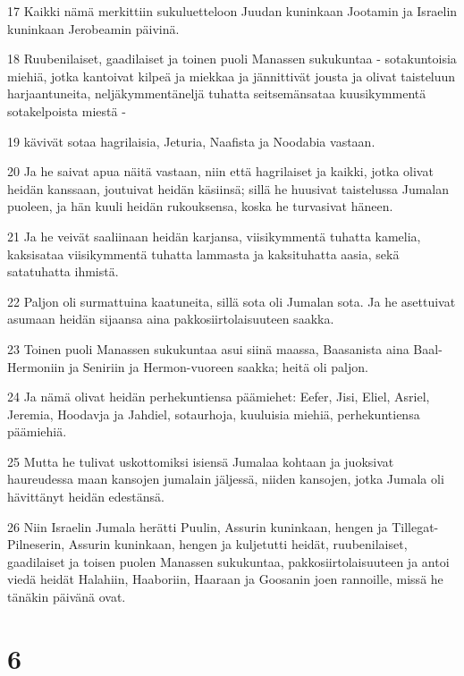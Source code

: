 \par 17 Kaikki nämä merkittiin sukuluetteloon Juudan kuninkaan Jootamin ja Israelin kuninkaan Jerobeamin päivinä.
\par 18 Ruubenilaiset, gaadilaiset ja toinen puoli Manassen sukukuntaa - sotakuntoisia miehiä, jotka kantoivat kilpeä ja miekkaa ja jännittivät jousta ja olivat taisteluun harjaantuneita, neljäkymmentäneljä tuhatta seitsemänsataa kuusikymmentä sotakelpoista miestä -
\par 19 kävivät sotaa hagrilaisia, Jeturia, Naafista ja Noodabia vastaan.
\par 20 Ja he saivat apua näitä vastaan, niin että hagrilaiset ja kaikki, jotka olivat heidän kanssaan, joutuivat heidän käsiinsä; sillä he huusivat taistelussa Jumalan puoleen, ja hän kuuli heidän rukouksensa, koska he turvasivat häneen.
\par 21 Ja he veivät saaliinaan heidän karjansa, viisikymmentä tuhatta kamelia, kaksisataa viisikymmentä tuhatta lammasta ja kaksituhatta aasia, sekä satatuhatta ihmistä.
\par 22 Paljon oli surmattuina kaatuneita, sillä sota oli Jumalan sota. Ja he asettuivat asumaan heidän sijaansa aina pakkosiirtolaisuuteen saakka.
\par 23 Toinen puoli Manassen sukukuntaa asui siinä maassa, Baasanista aina Baal-Hermoniin ja Seniriin ja Hermon-vuoreen saakka; heitä oli paljon.
\par 24 Ja nämä olivat heidän perhekuntiensa päämiehet: Eefer, Jisi, Eliel, Asriel, Jeremia, Hoodavja ja Jahdiel, sotaurhoja, kuuluisia miehiä, perhekuntiensa päämiehiä.
\par 25 Mutta he tulivat uskottomiksi isiensä Jumalaa kohtaan ja juoksivat haureudessa maan kansojen jumalain jäljessä, niiden kansojen, jotka Jumala oli hävittänyt heidän edestänsä.
\par 26 Niin Israelin Jumala herätti Puulin, Assurin kuninkaan, hengen ja Tillegat-Pilneserin, Assurin kuninkaan, hengen ja kuljetutti heidät, ruubenilaiset, gaadilaiset ja toisen puolen Manassen sukukuntaa, pakkosiirtolaisuuteen ja antoi viedä heidät Halahiin, Haaboriin, Haaraan ja Goosanin joen rannoille, missä he tänäkin päivänä ovat.

\chapter{6}

